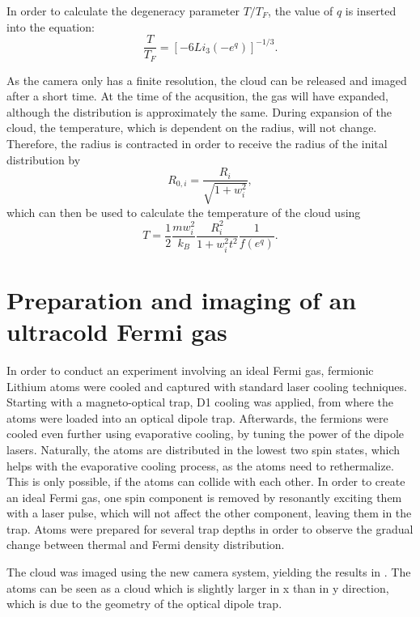 In order to calculate the degeneracy parameter $T/T_F$, the value of $q$ is inserted into the equation:
\begin{equation}
\label{eq:tovertf}
\frac{T}{T_F} = \left[ -6 Li_3(-e^q) \right]^{-1/3}.
\end{equation}

As the camera only has a finite resolution, the cloud can be released and imaged after a short time. At the time of the acqusition, the gas will have expanded, although the distribution is approximately the same. During expansion of the cloud, the temperature, which is dependent on the radius, will not change. Therefore, the radius is contracted in order to receive the radius of the inital distribution by
\begin{equation}
R_{0,i} = \frac{R_{i}}{\sqrt{1+ w_i^2}},
\end{equation}
which can then be used to calculate the temperature of the cloud using
\begin{equation}
\label{eq:temp}
T = \frac{1}{2} \frac{mw_i^2}{k_B} \frac{R_i^2}{1+w_i^2t^2}\frac{1}{f(e^q)}.
\end{equation}


	
\section{Preparation and imaging of an ultracold Fermi gas}
\label{sec:fermiexperiment}

In order to conduct an experiment involving an ideal Fermi gas, fermionic Lithium atoms were cooled and captured with standard laser cooling techniques\cite{Repp2013, Pires2014}. Starting with a magneto-optical trap, D1 cooling was applied, from where the atoms were loaded into an optical dipole trap. Afterwards, the fermions were cooled even further using evaporative cooling, by tuning the power of the dipole lasers. Naturally, the atoms are distributed in the lowest two spin states, which helps with the evaporative cooling process, as the atoms need to rethermalize. This is only possible, if the atoms can collide with each other. In order to create an ideal Fermi gas, one spin component is removed by resonantly exciting them with a laser pulse, which will not affect the other component, leaving them in the trap. Atoms were prepared for several trap depths in order to observe the gradual change between thermal and Fermi density distribution.

The cloud was imaged using the new camera system, yielding the results in . The atoms can be seen as a cloud which is slightly larger in x than in y direction, which is due to the geometry of the optical dipole trap.

